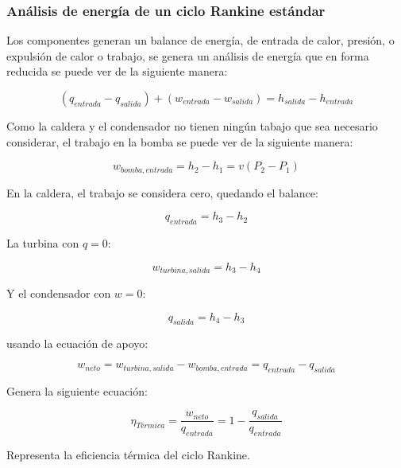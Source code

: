 \subsubsection{Análisis de energía de un ciclo Rankine estándar}

Los componentes generan un balance de energía, de entrada de calor, presión, o expulsión de calor o trabajo, se genera un análisis de energía que en forma reducida se puede ver de la siguiente manera:

\begin{equation}
    (q_{entrada}-q_{salida})+(w_{entrada}-w_{salida})=h_{salida}-h_{entrada}
\end{equation}

Como la caldera y el condensador no tienen ningún tabajo que sea necesario considerar, el trabajo en la bomba se puede ver de la siguiente manera:

\begin{equation}
    w_{bomba, entrada}=h_{2}-h_{1}=v(P_{2}-P_{1})
\end{equation}

En la caldera, el trabajo se considera cero, quedando el balance:

\begin{equation}
    q_{entrada}=h_{3}-h_{2}
\end{equation}

La turbina con $q=0$:

\begin{equation}
    w_{turbina,salida}=h_{3}-h_{4}
\end{equation}

Y el condensador con $w=0$:

\begin{equation}
    q_{salida}=h_{4}-h_{3}
\end{equation}

usando la ecuación de apoyo:

\begin{equation}
    w_{neto}=w_{turbina,salida}-w_{bomba, entrada}=q_{entrada}-q_{salida}
\end{equation}

Genera la siguiente ecuación:

\begin{equation}
    \eta_{Térmica}=\frac{w_{neto}}{q_{entrada}}=1-\frac{q_{salida}}{q_{entrada}}
\end{equation}

Representa la eficiencia térmica del ciclo Rankine.

